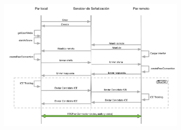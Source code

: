 \documentclass[notes,slidesec,a4]{seminar}
\begin{document}
\begin{hslide}
\begin{center}
\begin{figure}
\includegraphics[width=0.8\textwidth]{img/diagrama_general}
\end{figure}
\end{center}
\end{hslide}

\end{document}
